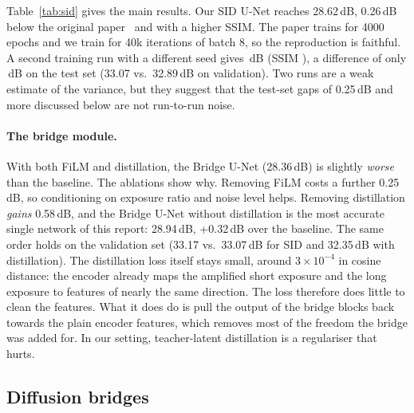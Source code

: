 Table~\ref{tab:sid} gives the main results. Our SID U-Net reaches 28.62\,dB, 0.26\,dB below the original paper~\cite{chen2018sid} and with a higher SSIM. The paper trains for 4000 epochs and we train for 40k iterations of batch 8, so the reproduction is faithful. A second training run with a different seed gives \SIDRERUNPSNR\,dB (SSIM \SIDRERUNSSIM), a difference of only \SIDSEEDGAP\,dB on the test set (33.07 vs.\ 32.89\,dB on validation). Two runs are a weak estimate of the variance, but they suggest that the test-set gaps of 0.25\,dB and more discussed below are not run-to-run noise.

\paragraph{The bridge module.} With both FiLM and distillation, the Bridge U-Net (28.36\,dB) is slightly \emph{worse} than the baseline. The ablations show why. Removing FiLM costs a further 0.25\,dB, so conditioning on exposure ratio and noise level helps. Removing distillation \emph{gains} 0.58\,dB, and the Bridge U-Net without distillation is the most accurate single network of this report: 28.94\,dB, +0.32\,dB over the baseline. The same order holds on the validation set (33.17 vs.\ 33.07\,dB for SID and 32.35\,dB with distillation). The distillation loss itself stays small, around $3\times10^{-4}$ in cosine distance: the encoder already maps the amplified short exposure and the long exposure to features of nearly the same direction. The loss therefore does little to clean the features. What it does do is pull the output of the bridge blocks back towards the plain encoder features, which removes most of the freedom the bridge was added for. In our setting, teacher-latent distillation is a regulariser that hurts.

\subsection{Diffusion bridges}
\label{sec:ddbmres}

